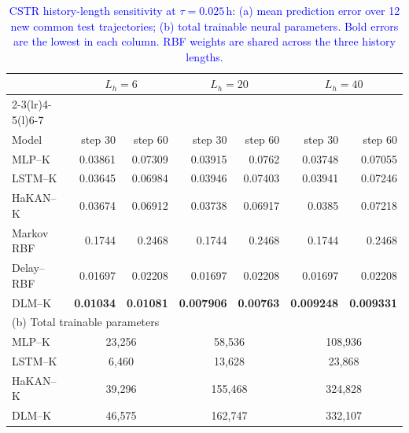 \begin{table}[pos=!htbp]
\color{blue}
\caption{\textcolor{blue}{CSTR history-length sensitivity at $\tau=0.025\,\mathrm{h}$: (a) mean prediction error over 12 new common test trajectories; (b) total trainable neural parameters. Bold errors are the lowest in each column. RBF weights are shared across the three history lengths.}}
\label{tab:cstr-history-sensitivity}
\centering\small
\setlength{\tabcolsep}{5pt}
\begin{tabular}{@{}lrrrrrr@{}}
\toprule
& \multicolumn{2}{c}{$L_h=6$} & \multicolumn{2}{c}{$L_h=20$} & \multicolumn{2}{c}{$L_h=40$} \\
\cmidrule(lr){2-3}\cmidrule(lr){4-5}\cmidrule(l){6-7}
\multicolumn{7}{l}{(a) Mean prediction error} \\
Model & step 30 & step 60 & step 30 & step 60 & step 30 & step 60 \\
\midrule
MLP--K & 0.03861 & 0.07309 & 0.03915 & 0.0762 & 0.03748 & 0.07055 \\
LSTM--K & 0.03645 & 0.06984 & 0.03946 & 0.07403 & 0.03941 & 0.07246 \\
HaKAN--K & 0.03674 & 0.06912 & 0.03738 & 0.06917 & 0.0385 & 0.07218 \\
Markov RBF & 0.1744 & 0.2468 & 0.1744 & 0.2468 & 0.1744 & 0.2468 \\
Delay--RBF & 0.01697 & 0.02208 & 0.01697 & 0.02208 & 0.01697 & 0.02208 \\
DLM--K & \textbf{0.01034} & \textbf{0.01081} & \textbf{0.007906} & \textbf{0.00763} & \textbf{0.009248} & \textbf{0.009331} \\
\midrule
\multicolumn{7}{l}{(b) Total trainable parameters} \\
MLP--K & \multicolumn{2}{c}{23,256} & \multicolumn{2}{c}{58,536} & \multicolumn{2}{c}{108,936} \\
LSTM--K & \multicolumn{2}{c}{6,460} & \multicolumn{2}{c}{13,628} & \multicolumn{2}{c}{23,868} \\
HaKAN--K & \multicolumn{2}{c}{39,296} & \multicolumn{2}{c}{155,468} & \multicolumn{2}{c}{324,828} \\
DLM--K & \multicolumn{2}{c}{46,575} & \multicolumn{2}{c}{162,747} & \multicolumn{2}{c}{332,107} \\
\bottomrule
\end{tabular}
\end{table}
